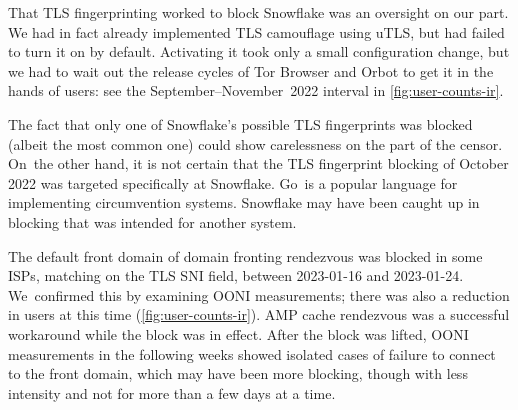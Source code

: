 \documentclass[letterpaper,twocolumn]{article}
\begin{document}
That TLS fingerprinting worked to block Snowflake
was an oversight on our part.
We had in fact already implemented TLS camouflage using uTLS,
but had failed to turn it on by default.
Activating it took only a small configuration change,
but we had to wait out the release cycles of Tor Browser and Orbot
to get it in the hands of users:
see the September--November~2022 interval in \autoref{fig:user-counts-ir}.

The fact that only one of Snowflake's possible TLS fingerprints was blocked
(albeit the most common one)
could show carelessness on the part of the censor.
On~the other hand, it is not certain that the TLS fingerprint blocking of October 2022
was targeted specifically at Snowflake.
Go~is a popular language for implementing circumvention systems.
Snowflake may have been caught up in blocking that was intended for another system.


The default front domain of domain fronting rendezvous
was blocked in some ISPs, matching on the TLS SNI field,
between \mbox{2023-01-16} and \mbox{2023-01-24}.
We~confirmed this by examining OONI measurements;
there was also a reduction in users at this time (\autoref{fig:user-counts-ir}).
AMP cache rendezvous was a successful workaround while the block was in effect.
After the block was lifted,
OONI measurements in the following weeks showed isolated cases
of failure to connect to the front domain,
which may have been more blocking,
though with less intensity and not for more than a few days at a time.
\end{document}
